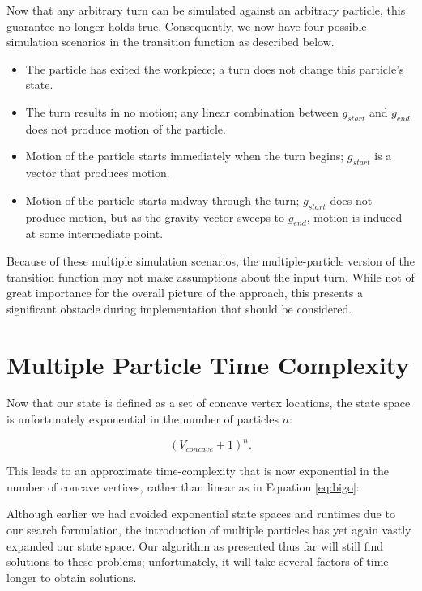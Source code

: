 Now that any arbitrary turn can be simulated against an arbitrary particle, this guarantee no longer holds true. Consequently, we now have four possible simulation scenarios in the transition function as described below.


\begin{itemize}
\item The particle has exited the workpiece; a turn does not change this particle's state.
\item The turn results in no motion; any linear combination between $g_{start}$ and $g_{end}$ does not produce motion of the particle.
\item Motion of the particle starts immediately when the turn begins; $g_{start}$ is a vector that produces motion.
\item Motion of the particle starts midway through the turn; $g_{start}$ does not produce motion, but as the gravity vector sweeps to $g_{end}$, motion is induced at some intermediate point.
\end{itemize}

Because of these multiple simulation scenarios, the multiple-particle version of the transition function may not make assumptions about the input turn. While not of great importance for the overall picture of the approach, this presents a significant obstacle during implementation that should be considered.

\section{Multiple Particle Time Complexity}

Now that our state is defined as a set of concave vertex locations, the state space is unfortunately exponential in the number of particles $n$:

$$
(V_{concave} + 1)^n.
$$

This leads to an approximate time-complexity that is now exponential in the number of concave vertices, rather than linear as in Equation \eqref{eq:bigo}:

 {
  \label{eq:bigoTotal}
}

Although earlier we had avoided exponential state spaces and runtimes due to our search formulation, the introduction of multiple particles has yet again vastly expanded our state space. Our algorithm as presented thus far will still find solutions to these problems; unfortunately, it will take several factors of time longer to obtain solutions.

